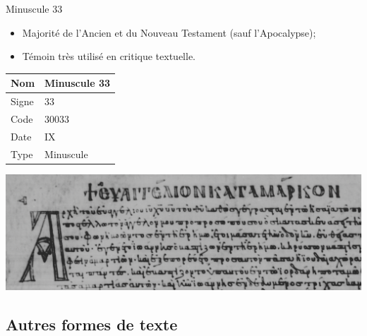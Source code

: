 \documentclass[11pt]{beamer}
\begin{document}
\begin{frame}{Minuscule 33}
        \begin{block}{}
        \begin{itemize}
            \item Majorité de l'Ancien et du Nouveau Testament (sauf l'Apocalypse);
            \item Témoin très utilisé en critique textuelle.
        \end{itemize}
    \end{block}
    \vfill
    \begin{minipage}{.45\textwidth}
\begin{tabularx}{\textwidth}{l|X}
    \small
     Nom & Minuscule 33 \\
     \hline
     Signe & 33 \\
     \hline
     Code & 30033\\
     \hline
     Date & IX\ieme{} \\
     \hline
     Type & Minuscule \\
\end{tabularx}
\end{minipage}
\hfill
\begin{minipage}{.45\textwidth}
    \includegraphics[scale=.16]{img/minuscule33.png}
\end{minipage}
\end{frame}

\subsection{Autres formes de texte}
\end{document}
